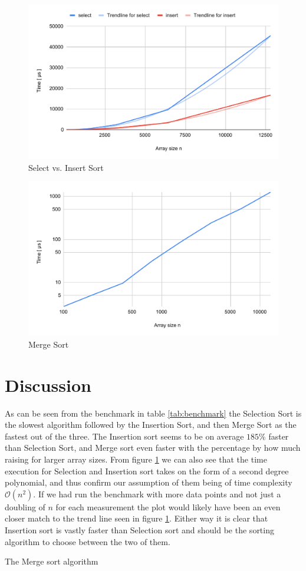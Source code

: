 \documentclass[a4paper,11pt]{article}
\begin{document}
\begin{figure}[h!]
    \centering
    \includegraphics[width=.8\textwidth]{Select and Insert Sort.pdf}
    \caption{Select vs. Insert Sort}
    \label{fig:selectInsert}
\end{figure}

\begin{figure}[h!]
    \centering
    \includegraphics[width=.8\textwidth]{Merge Sort.pdf}
    \caption{Merge Sort}
    \label{fig:merge}
\end{figure}
\section*{Discussion}
As can be seen from the benchmark in table \ref{tab:benchmark} the Selection Sort is the slowest algorithm followed by the Insertion Sort, and then Merge Sort as
the fastest out of the three. The Insertion sort seems to be on average $185\%$ faster than Selection Sort, and Merge sort even faster with the percentage by how 
much raising for larger array sizes. From figure \ref{fig:selectInsert} we can also see that the time execution for Selection and Insertion sort takes on the form 
of a second degree polynomial, and thus confirm our assumption of them being of time complexity $\mathcal{O}(n^2)$. If we had run the benchmark with more data 
points and not just a doubling of $n$ for each measurement the plot would likely have been an even closer match to the trend line seen in figure \ref{fig:selectInsert}.
Either way it is clear that Insertion sort is vastly faster than Selection sort and should be the sorting algorithm to choose between the two of them.

The Merge sort algorithm 
\end{document}

